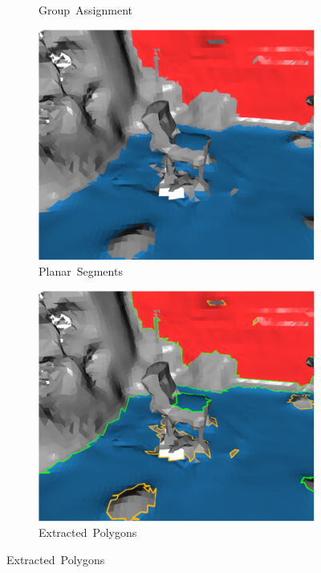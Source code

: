 \begin{figure}[!ht]
\begin{subfigure}[t]{.22\linewidth}
    \caption{Group~Assignment\label{fig:ch3_planar_seg_b}}\vspace{6pt}
  \end{subfigure}
  \hfill
  \begin{subfigure}[t]{.22\linewidth}
    \centering\includegraphics[clip,trim=0cm 0cm 0cm 0cm,width=.99\linewidth]{chapter_3_polylidar3d/imgs/meshes/planar_segment-region_c.pdf}
    \caption{Planar~Segments\label{fig:ch3_planar_seg_c}}\vspace{6pt}
  \end{subfigure}
  \hfill
  \begin{subfigure}[t]{.22\linewidth}
    \centering\includegraphics[clip,trim=0cm 0cm 0cm 0cm,width=.99\linewidth]{chapter_3_polylidar3d/imgs/meshes/planar_segment-region_d.pdf}
    \caption{Extracted~Polygons\label{fig:ch3_planar_seg_d}}\vspace{6pt}
  \end{subfigure}


\end{figure}

